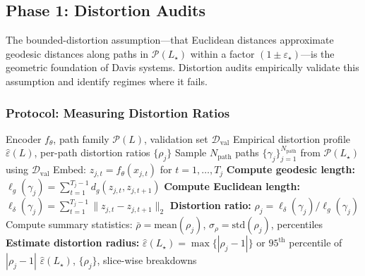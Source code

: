 \documentclass[11pt]{article}
\theoremstyle{remark}
\theoremstyle{plain}
\begin{document}
\subsection{Phase 1: Distortion Audits}
\label{subsec:distortion-audits}

The bounded-distortion assumption—that Euclidean distances approximate geodesic distances along paths in $\mathcal{P}(L_\star)$ within a factor $(1\pm\varepsilon_\star)$—is the geometric foundation of Davis systems. Distortion audits empirically validate this assumption and identify regimes where it fails.

\subsubsection{Protocol: Measuring Distortion Ratios}

\begin{algorithm}[H]
\caption{Distortion Audit on Validation Paths}
\label{alg:distortion-audit}
\begin{algorithmic}[1]
\Require Encoder $f_\theta$, path family $\mathcal{P}(L)$, validation set $\mathcal{D}_{\mathrm{val}}$
\Ensure Empirical distortion profile $\hat\varepsilon(L)$, per-path distortion ratios $\{\rho_j\}$
\State Sample $N_{\mathrm{path}}$ paths $\{\gamma_j\}_{j=1}^{N_{\mathrm{path}}}$ from $\mathcal{P}(L_\star)$ using $\mathcal{D}_{\mathrm{val}}$
    \State Embed: $z_{j,t} = f_\theta(x_{j,t})$ for $t=1,\dots,T_j$
    \State \textbf{Compute geodesic length:} $\ell_g(\gamma_j) = \sum_{t=1}^{T_j-1} d_g(z_{j,t}, z_{j,t+1})$ \quad {}
    \State \textbf{Compute Euclidean length:} $\ell_\delta(\gamma_j) = \sum_{t=1}^{T_j-1} \|z_{j,t} - z_{j,t+1}\|_2$
    \State \textbf{Distortion ratio:} $\rho_j = \ell_\delta(\gamma_j) / \ell_g(\gamma_j)$
\EndFor
\State Compute summary statistics: $\bar\rho = \text{mean}(\rho_j)$, $\sigma_\rho = \text{std}(\rho_j)$, percentiles
\State \textbf{Estimate distortion radius:} $\hat\varepsilon(L_\star) = \max\{|\rho_j - 1|\}$ or $95^{\text{th}}$ percentile of $|\rho_j - 1|$
\State \Return $\hat\varepsilon(L_\star)$, $\{\rho_j\}$, slice-wise breakdowns
\end{algorithmic}
\end{algorithm}
\end{document}
